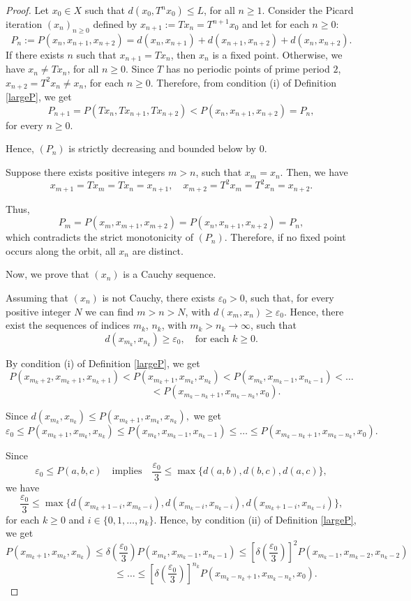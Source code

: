 \documentclass[12 pt]{article}
\theoremstyle{lema}
\theoremstyle{proposition}
\theoremstyle{theorem}
\theoremstyle{theorem}
\theoremstyle{corollary}
\theoremstyle{definition}
\theoremstyle{example}
\begin{document}
	\begin{proof}
		Let \(x_0 \in X\) such that \(d(x_0, T^nx_0)\leq L \), for all \(n \geq 1\). Consider the Picard iteration \((x_n)_{n\geq 0}\) defined by \(x_{n+1}:=Tx_n=T^{n+1}x_0\) and let for each \(n \geq 0\):
	\[P_n:= P(x_n, x_{n+1}, x_{n+2}) = d(x_n,x_{n+1})+d(x_{n+1},x_{n+2})+d(x_n,x_{n+2}).\]
		If there exists \(n\) such that $x_{n+1}=Tx_n$, then \(x_n\) is a fixed point. Otherwise, we have \(x_n\neq Tx_n\), for all \(n \geq 0\). Since $T$ has no periodic points of prime period \(2\), \(x_{n+2}=T^2x_n \neq x_n\), for each $n \geq 0$. Therefore, from condition (i) of Definition \ref{largeP}, we get 
	\[P_{n+1} = P(Tx_n, Tx_{n+1}, Tx_{n+2}) < P(x_n, x_{n+1}, x_{n+2}) = P_n,\]
		for every $n \geq 0$.
		
		Hence, \((P_n)\) is strictly decreasing and bounded below by \(0\).
		
		Suppose there exists positive integers \(m>n\), such that \(x_m=x_n\). Then, we have
		\[ x_{m+1} = Tx_m = Tx_n = x_{n+1}, \quad x_{m+2} = T^2x_m = T^2x_n = x_{n+2}. \]
		
		Thus, 
		\[ P_m = P(x_m, x_{m+1}, x_{m+2}) = P(x_n, x_{n+1}, x_{n+2}) = P_n, \]
		which contradicts the strict monotonicity of \((P_n)\). Therefore, if no fixed point occurs along the orbit, all \(x_n\) are distinct.
		
		Now, we prove that \((x_n)\) is a Cauchy sequence.
		
		Assuming that \((x_n)\) is not Cauchy, there exists \(\varepsilon_0 > 0\), such that, for every positive integer \(N\) we can find \(m > n > N\), with \(d(x_m,x_n) \geq \varepsilon_0\). Hence, there exist the sequences of indices \(m_k\), \(n_k\), with \(m_k>n_k \to \infty\), such that
		\[d(x_{m_k}, x_{n_k})\geq \varepsilon_0, \quad \text{for each } k \geq 0. \]
		
		By condition (i) of Definition \ref{largeP}, we get 
		\[P(x_{m_k+2}, x_{m_k+1}, x_{n_k+1}) < P(x_{m_k+1}, x_{m_k}, x_{n_k}) < P(x_{m_k}, x_{m_k-1}, x_{n_k-1}) < \dots \]
		\[\quad \qquad \qquad \qquad < P(x_{m_k-n_k+1}, x_{m_k-n_k}, x_{0}).\]
		
		Since \(d(x_{m_k}, x_{n_k}) \leq P(x_{m_k+1}, x_{m_k}, x_{n_k}),\) we get
		\[\varepsilon_0 \leq P(x_{m_k+1}, x_{m_k}, x_{n_k}) \leq P(x_{m_k}, x_{m_k-1}, x_{n_k-1}) \leq \dots \leq P(x_{m_k-n_k+1}, x_{m_k-n_k}, x_{0}).\]
		
		Since 
		\[\varepsilon_0 \leq P(a,b,c) \quad \text{implies} \quad \dfrac{\varepsilon_0}{3}\leq \max \{d(a,b), d(b,c), d(a,c)\}, \]
		we have \[ \dfrac{\varepsilon_0}{3}\leq \max \{d(x_{m_k+1-i},x_{m_k-i}), d(x_{m_k-i},x_{n_k-i}), d(x_{m_k+1-i},x_{n_k-i})\}, \]
		for each \(k \geq 0\) and \(i \in \{0,1,\dots, n_k\}\). Hence, by condition (ii) of Definition \ref{largeP}, we get
		\[ P(x_{m_k+1}, x_{m_k}, x_{n_k}) \leq \delta\left(\dfrac{\varepsilon_0}{3}\right) P(x_{m_k}, x_{m_k-1}, x_{n_k-1}) \leq \left[\delta\left(\dfrac{\varepsilon_0}{3}\right)\right]^2 P(x_{m_k-1}, x_{m_k-2}, x_{n_k-2})  \]
		\[\quad \qquad \qquad \qquad \leq \dots \leq \left[\delta\left(\dfrac{\varepsilon_0}{3}\right)\right]^{n_k}  P(x_{m_k-n_k+1}, x_{m_k-n_k}, x_{0}).\]
		

\end{proof}
\end{document}
